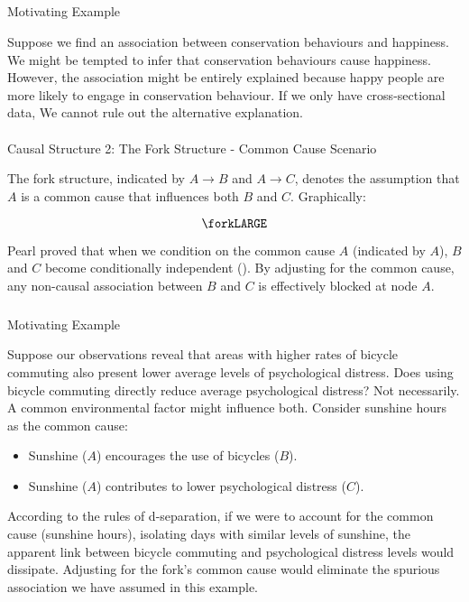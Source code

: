 \documentclass[
  singlecolumn]{article}
\makeatletter
\let\oldparagraph\paragraph
\renewcommand{\paragraph}{
    \@ifstar
      \xxxParagraphStar
      \xxxParagraphNoStar
  }
\newcommand{\xxxParagraphStar}[1]{\oldparagraph*{#1}\mbox{}}
\newcommand{\xxxParagraphNoStar}[1]{\oldparagraph{#1}\mbox{}}
\let\oldsubparagraph\subparagraph
\renewcommand{\subparagraph}{
    \@ifstar
      \xxxSubParagraphStar
      \xxxSubParagraphNoStar
  }
\newcommand{\xxxSubParagraphStar}[1]{\oldsubparagraph*{#1}\mbox{}}
\newcommand{\xxxSubParagraphNoStar}[1]{\oldsubparagraph{#1}\mbox{}}
\providecommand{\tightlist}{%
  \setlength{\itemsep}{0pt}\setlength{\parskip}{0pt}}\usepackage{longtable,booktabs,array}
\makeatother
\begin{document}
\subparagraph{Motivating Example}\label{motivating-example}

Suppose we find an association between conservation behaviours and
happiness. We might be tempted to infer that conservation behaviours
cause happiness. However, the association might be entirely explained
because happy people are more likely to engage in conservation
behaviour. If we only have cross-sectional data, We cannot rule out the
alternative explanation.

\paragraph{Causal Structure 2: The Fork Structure - Common Cause
Scenario}\label{causal-structure-2-the-fork-structure---common-cause-scenario}

The fork structure, indicated by \(A \rightarrow B\) and
\(A \rightarrow C\), denotes the assumption that \(A\) is a common cause
that influences both \(B\) and \(C\). Graphically:

\[\forkLARGE\]

Pearl proved that when we condition on the common cause \(A\) (indicated
by \(\boxed{A}\)), \(B\) and \(C\) become conditionally independent
(). By adjusting for the common
cause, any non-causal association between \(B\) and \(C\) is effectively
blocked at node \(A\).

\subparagraph{Motivating Example}\label{motivating-example-1}

Suppose our observations reveal that areas with higher rates of bicycle
commuting also present lower average levels of psychological distress.
Does using bicycle commuting directly reduce average psychological
distress? Not necessarily. A common environmental factor might influence
both. Consider sunshine hours as the common cause:

\begin{itemize}
\tightlist
\item
  Sunshine (\(A\)) encourages the use of bicycles (\(B\)).
\item
  Sunshine (\(A\)) contributes to lower psychological distress (\(C\)).
\end{itemize}

According to the rules of d-separation, if we were to account for the
common cause (sunshine hours), isolating days with similar levels of
sunshine, the apparent link between bicycle commuting and psychological
distress levels would dissipate. Adjusting for the fork's common cause
would eliminate the spurious association we have assumed in this
example.
\end{document}
